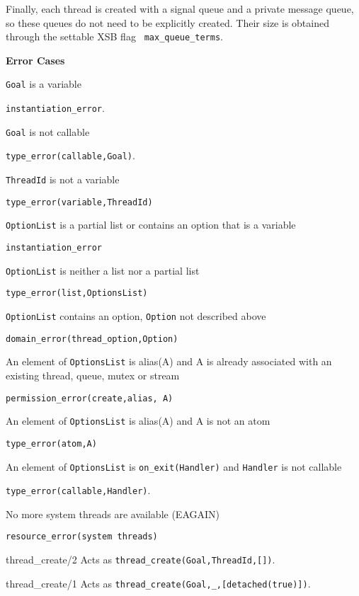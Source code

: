 \begin{description}
Finally, each thread is created with a signal queue and a private
message queue, so these queues do not need to be explicitly created.
Their size is obtained through the settable XSB flag {\tt
  max\_queue\_terms}.

{\bf Error Cases}
\bi
\item 	{\tt Goal} is a variable
\bi
\item 	{\tt instantiation\_error}.
\ei
\item 	{\tt Goal} is not callable
\bi
\item 	{\tt type\_error(callable,Goal)}.
\ei
\item 	{\tt ThreadId} is not a variable
\bi
\item 	{\tt type\_error(variable,ThreadId)}
\ei
\item 	{\tt OptionList} is a partial list or contains an option that is a variable
\bi
\item 	{\tt instantiation\_error}
\ei
\item 	{\tt OptionList} is neither a list nor a partial list
\bi
\item 	{\tt type\_error(list,OptionsList)}
\ei
\item 	{\tt OptionList} contains an option, {\tt Option} not described above
\bi
\item 	{\tt domain\_error(thread\_option,Option)}
\ei
\item An element of {\tt OptionsList} is alias(A) and A is already
  associated with an existing thread, queue, mutex or stream 
\bi
\item {\tt permission\_error(create,alias, A)}
\ei
\item An element of {\tt OptionsList} is alias(A) and A is not an atom
\bi
\item {\tt type\_error(atom,A)}
\ei
\item An element of {\tt OptionsList} is {\tt on\_exit(Handler)} and
      {\tt Handler} is not callable 
\bi
\item 	{\tt type\_error(callable,Handler)}.
\ei
\item   No more system threads are available (EAGAIN)
\bi
\item {\tt resource\_error(system threads)}
\ei
\ei

{thread\_create/2}
%
Acts as {\tt thread\_create(Goal,ThreadId,[])}.

{thread\_create/1}
%
Acts as {\tt thread\_create(Goal,\_,[detached(true)])}.


\end{description}
